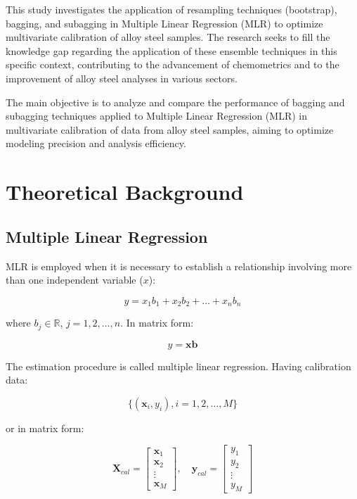 \documentclass[12pt]{article}
\begin{document}
This study investigates the application of resampling techniques (bootstrap), bagging, and subagging in Multiple Linear Regression (MLR) to optimize multivariate calibration of alloy steel samples. The research seeks to fill the knowledge gap regarding the application of these ensemble techniques in this specific context, contributing to the advancement of chemometrics and to the improvement of alloy steel analyses in various sectors.\cite{Pimentel:1998}

The main objective is to analyze and compare the performance of bagging and subagging techniques applied to Multiple Linear Regression (MLR) in multivariate calibration of data from alloy steel samples, aiming to optimize modeling precision and analysis efficiency.

\section{Theoretical Background}

\subsection{Multiple Linear Regression}

MLR is employed when it is necessary to establish a relationship involving more than one independent variable ($x$):

\begin{equation}
y = x_1b_1 + x_2b_2 + \ldots + x_nb_n
\end{equation}

\noindent where $b_j \in \mathbb{R}$, $j = 1, 2, \ldots, n$. In matrix form:

\begin{equation}
y = \mathbf{xb}
\end{equation}

The estimation procedure is called multiple linear regression.\cite{Kramer:1998,Martens:1989} Having calibration data:

\begin{equation}
\{(\mathbf{x}_i, y_i), i = 1, 2, \ldots, M\}
\end{equation}

or in matrix form:

\begin{equation}
\mathbf{X}_{cal} = \begin{bmatrix} \mathbf{x}_1 \\ \mathbf{x}_2 \\ \vdots \\ \mathbf{x}_M \end{bmatrix}, \quad
\mathbf{y}_{cal} = \begin{bmatrix} y_1 \\ y_2 \\ \vdots \\ y_M \end{bmatrix}
\end{equation}
\end{document}
